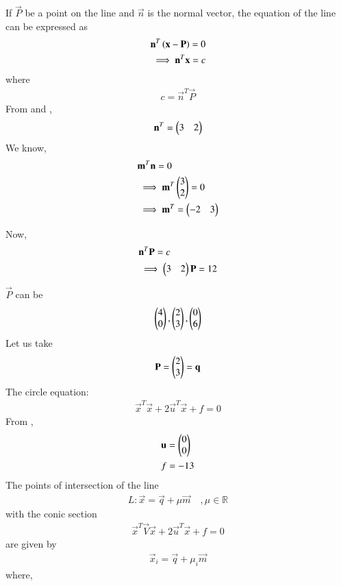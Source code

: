 If $\vec P$ be a point on the line and $\vec n$ is the normal vector, the equation of the line can be expressed as 
\begin{align}
    & \mathbf n^T\left(\mathbf x - \mathbf P\right)=0\\
    & \label{eq:solutions/4/2/2/eq2}\implies \mathbf n^T \mathbf x = c
\end{align}
where
\begin{align}
    c= \vec n^T \vec P
\end{align}
From \brak{\ref{eq:solutions/4/2/2/eq1}} and \brak{\ref{eq:solutions/4/2/2/eq2}}, 
\begin{align}
     \mathbf n^T = \begin{pmatrix}3 & 2\end{pmatrix}
\end{align}
We know,
\begin{align}
    &\mathbf m^T \mathbf n = 0\\
    &\implies \mathbf m^T \begin{pmatrix}3 \\2\end{pmatrix} = 0\\
    &\implies \mathbf m ^T = \begin{pmatrix}-2 & 3\end{pmatrix}
\end{align}

Now,
\begin{align}
    &\mathbf n^T \mathbf P = c \\
    &\implies \begin{pmatrix}3 & 2\end{pmatrix} \mathbf P= 12
\end{align}

$\vec P$ can be
\begin{align}
    \begin{pmatrix}4\\0\end{pmatrix}, \begin{pmatrix}2\\3\end{pmatrix}, \begin{pmatrix}0\\6\end{pmatrix}
\end{align}
Let us take 
\begin{align}
    \mathbf P =\begin{pmatrix}2\\3\end{pmatrix}=\mathbf q
\end{align}
The circle equation:
\begin{align}
    \vec x^T \vec x + 2 \vec u^T\vec x +f=0
\end{align}
From \brak{\ref{eq:solutions/4/2/2/eq:circle}},
\begin{align}
    &\mathbf u=\begin{pmatrix}0\\0\end{pmatrix}\\
    & f=-13
\end{align}
The points of intersection of the line
\begin{align}
    L: \vec x = \vec q + \mu \vec m \quad ,\mu \in \mathbb R
\end{align}
with the conic section
\begin{align}
    \vec x^T \vec V \vec x +2\vec u^T \vec x+ f=0
\end{align}
are given by 
\begin{align}
    \label{eq:solutions/4/2/2/points of intersection}\vec x_i = \vec q + \mu _i \vec m
\end{align}
where,

